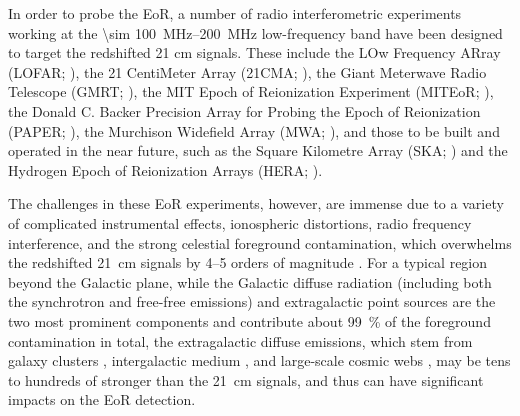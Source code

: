 \documentclass[modern]{aastex62}
\begin{document}
In order to probe the EoR, a number of radio interferometric experiments
working at the \SIrange{\sim 100}{200}{\MHz} low-frequency band have been
designed to target the redshifted 21 cm signals.
These include the LOw Frequency ARray (LOFAR; \citealt{vanHaarlem2013}),
the 21 CentiMeter Array (21CMA; \citealt{zheng2016}),
the Giant Meterwave Radio Telescope (GMRT; \citealt{paciga2011}),
the MIT Epoch of Reionization Experiment (MITEoR; \citealt{zheng2014}),
the Donald C. Backer Precision Array for Probing the Epoch of
Reionization (PAPER; \citealt{parsons2010}),
the Murchison Widefield Array (MWA; \citealt{bowman2013,tingay2013}),
and those to be built and operated in the near future, such as the Square
Kilometre Array (SKA; \citealt{mellema2013rev,koopmans2015rev}) and
the Hydrogen Epoch of Reionization Arrays (HERA; \citealt{deboer2017}).

The challenges in these EoR experiments, however, are immense
due to a variety of complicated instrumental effects,
ionospheric distortions, radio frequency interference, and the
strong celestial foreground contamination, which overwhelms the
redshifted 21~cm signals by \numrange{4}{5} orders of magnitude
\citep[e.g.,][]{beardsley2016,murray2017,procopio2017}.
For a typical region beyond the Galactic plane,
while the Galactic diffuse radiation (including both the synchrotron
and free-free emissions) and extragalactic point sources are the two
most prominent components and contribute about \SI{99}{\percent} of
the foreground contamination in total, the extragalactic diffuse emissions,
which stem from galaxy clusters \citep[e.g.,][]{feretti2012rev,kale2016rev},
intergalactic medium \citep[e.g.,][]{keshet2004}, and large-scale cosmic
webs \citep[e.g.,][]{arayaMelo2012,vazza2015},
may be tens to hundreds of stronger than the 21~cm signals,
and thus can have significant impacts on the EoR detection.
\end{document}

